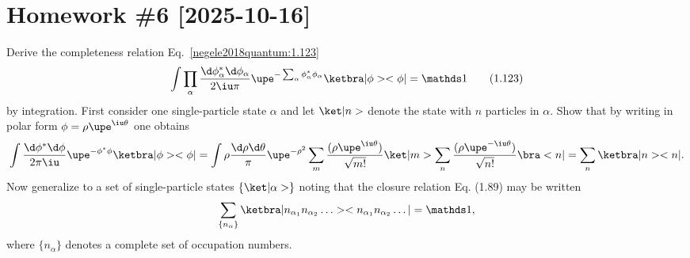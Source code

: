 
\section*{Homework \#6 [2025-10-16]}

\begin{problem}
  Derive the completeness relation Eq.~\eqref{negele2018quantum:1.123}
  \begin{equation}
    \int \prod_\alpha \frac{\d\phi_\alpha^* \d\phi_\alpha}{2\iu\pi}
    \upe^{-\sum_\alpha \phi_\alpha^*\phi_\alpha} \ketbra|\phi><\phi| = \identity
    \tag{1.123}
    \label{negele2018quantum:1.123}
  \end{equation}
  by integration. First consider
  one single-particle state $\alpha$ and let $\ket|n>$ denote the state with $n$
  particles in $\alpha$. Show that by writing in polar form
  $\phi = \rho \upe^{\iu\theta}$ one obtains
  \[
    \int \frac{\d\phi^* \d\phi}{2\pi\iu} \upe^{-\phi^*\phi} \ketbra|\phi><\phi|
  = \int \rho \frac{\d\rho \d\theta}{\pi} \upe^{-\rho^2}
    \sum_m \frac{(\rho\upe^{\iu\theta})}{\sqrt{m!}} \ket|m>
    \sum_n \frac{(\rho\upe^{-\iu\theta})}{\sqrt{n!}} \bra<n|
  = \sum_n \ketbra|n><n|.
  \]
  Now generalize to a set of single-particle states $\{\ket|\alpha>\}$ noting
  that the closure relation Eq. (1.89) may be written
  \[
    \sum_{\{n_\alpha\}}
    \ketbra|n_{\alpha_1} n_{\alpha_2} \ldots><n_{\alpha_1} n_{\alpha_2} \ldots|
  = \identity,
  \]
  where $\{n_\alpha\}$ denotes a complete set of occupation numbers.
\end{problem}
